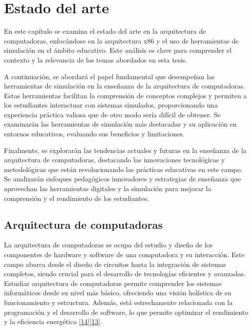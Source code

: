 \documentclass[12pt,twoside]{templates/unerthesis}
\begin{document}
\hypertarget{estado-del-arte}{%
\chapter{Estado del arte}\label{estado-del-arte}}

En este capítulo se examina el estado del arte en la arquitectura de computadoras, enfocándose en la arquitectura x86 y el uso de herramientas de simulación en el ámbito educativo. Este análisis es clave para comprender el contexto y la relevancia de los temas abordados en esta tesis.

A continuación, se abordará el papel fundamental que desempeñan las herramientas de simulación en la enseñanza de la arquitectura de computadoras. Estas herramientas facilitan la comprensión de conceptos complejos y permiten a los estudiantes interactuar con sistemas simulados, proporcionando una experiencia práctica valiosa que de otro modo sería difícil de obtener. Se examinarán las herramientas de simulación más destacadas y su aplicación en entornos educativos, evaluando sus beneficios y limitaciones.

Finalmente, se explorarán las tendencias actuales y futuras en la enseñanza de la arquitectura de computadoras, destacando las innovaciones tecnológicas y metodológicas que están revolucionando las prácticas educativas en este campo. Se analizarán enfoques pedagógicos innovadores y estrategias de enseñanza que aprovechan las herramientas digitales y la simulación para mejorar la comprensión y el rendimiento de los estudiantes.

\hypertarget{arquitectura-de-computadoras}{%
\section{Arquitectura de computadoras}\label{arquitectura-de-computadoras}}

La arquitectura de computadoras se ocupa del estudio y diseño de los componentes de hardware y software de una computadora y su interacción. Este campo abarca desde el diseño de circuitos hasta la integración de sistemas completos, siendo crucial para el desarrollo de tecnologías eficientes y avanzadas. Estudiar arquitectura de computadoras permite comprender los sistemas informáticos desde su nivel más básico, ofreciendo una visión holística de su funcionamiento y estructura. Además, está estrechamente relacionada con la programación y el desarrollo de software, lo que permite optimizar el rendimiento y la eficiencia energética {[}\protect\hyperlink{ref-stallings_computer_2013}{14}{]}{[}\protect\hyperlink{ref-hennessy_computer_2012}{13}{]}.
\end{document}
